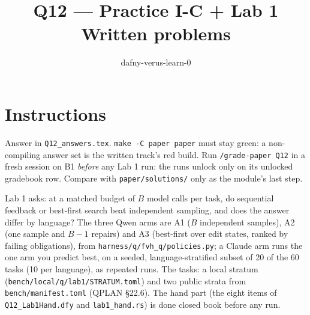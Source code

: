 \documentclass[11pt]{article}
\title{Q12 --- Practice I-C + Lab 1 \\ \large Written problems}
\author{dafny-verus-learn-0}
\date{}
\begin{document}
\maketitle

\section*{Instructions}
Answer in \texttt{Q12\_answers.tex}. \texttt{make -C paper paper} must stay
green: a non-compiling answer set is the written track's red build. Run
\texttt{/grade-paper Q12} in a fresh session on B1 \emph{before} any Lab 1
run: the runs unlock only on its unlocked gradebook row. Compare with
\texttt{paper/solutions/} only as the module's last step.

Lab 1 asks: at a matched budget of $B$ model calls per task, do sequential
feedback or best-first search beat independent sampling, and does the answer
differ by language? The three Qwen arms are A1 ($B$ independent samples), A2
(one sample and $B - 1$ repairs) and A3 (best-first over edit states, ranked by
failing obligations), from \texttt{harness/q/fvh\_q/policies.py}; a Claude arm
runs the one arm you predict best, on a seeded, language-stratified subset of
20 of the 60 tasks (10 per language), as repeated runs. The tasks: a local
stratum (\texttt{bench/local/q/lab1/STRATUM.toml}) and two public strata from
\texttt{bench/manifest.toml} (QPLAN §22.6). The hand part (the eight items of
\texttt{Q12\_Lab1Hand.dfy} and \texttt{lab1\_hand.rs}) is done closed book
before any run.
\end{document}
